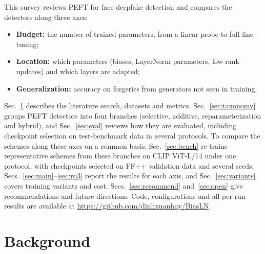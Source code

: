 \documentclass[fonts]{icst}
\begin{document}
This survey reviews PEFT for face deepfake detection and compares the detectors along three axes:
\begin{itemize}[leftmargin=*, topsep=2pt, itemsep=2pt]
    \item \textbf{Budget:} the number of trained parameters, from a linear probe to full fine-tuning;
    \item \textbf{Location:} which parameters (biases, LayerNorm parameters, low-rank updates) and which layers are adapted;
    \item \textbf{Generalization:} accuracy on forgeries from generators not seen in training.
\end{itemize}
Sec.~\ref{sec:background} describes the literature search, datasets and metrics. Sec.~\ref{sec:taxonomy} groups PEFT detectors into four branches (selective, additive, reparameterization and hybrid), and Sec.~\ref{sec:eval} reviews how they are evaluated, including checkpoint selection on test-benchmark data in several protocols. To compare the schemes along these axes on a common basis, Sec.~\ref{sec:bench} re-trains representative schemes from these branches on CLIP ViT-L/14 under one protocol, with checkpoints selected on FF++ validation data and several seeds; Secs.~\ref{sec:main}--\ref{sec:rq3} report the results for each axis, and Sec.~\ref{sec:variants} covers training variants and cost. Secs.~\ref{sec:recommend} and~\ref{sec:open} give recommendations and future directions.
Code, configurations and all per-run results are available at \href{https://github.com/dinhxuanhuy/BiasLN}{https://github.com/dinhxuanhuy/BiasLN}.

\section{Background}
\label{sec:background}
\end{document}
